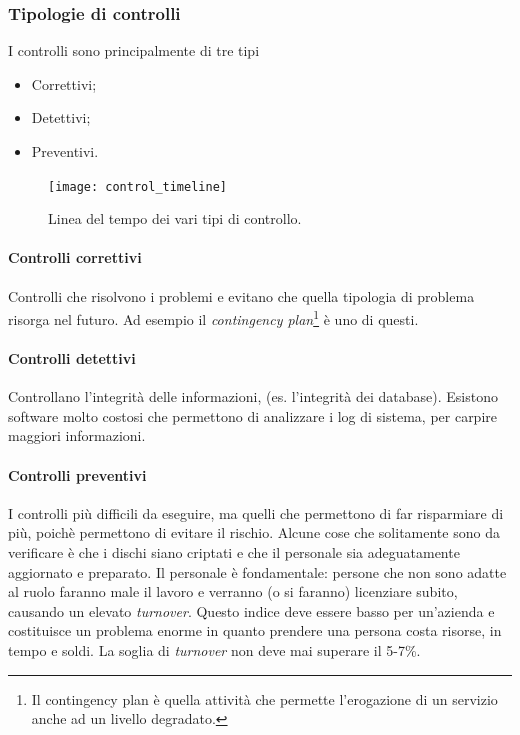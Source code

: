 \subsubsection{Tipologie di controlli}

I controlli sono principalmente di tre tipi
\begin{itemize}
\item Correttivi;
\item Detettivi;
\item Preventivi.
\end{itemize}

\begin{figure}[H]
	\begin{center}
\texttt{[image: control\_timeline]}
	\end{center}
	\caption{Linea del tempo dei vari tipi di controllo.}
\end{figure}

\paragraph*{Controlli correttivi} Controlli che risolvono i problemi e
evitano che quella tipologia di problema risorga nel futuro. Ad esempio il
\textit{contingency plan}\footnote{Il contingency plan è quella
attività che permette l'erogazione di un servizio anche ad un livello
degradato.} è uno di questi.

\paragraph*{Controlli detettivi} Controllano l'integrità delle
informazioni, (es. l'integrità dei database). Esistono software
molto costosi che permettono di analizzare i log di sistema, per carpire
maggiori informazioni.

\paragraph*{Controlli preventivi} I controlli più difficili da eseguire, ma
quelli che permettono di far risparmiare di più, poichè permettono di evitare
il rischio. Alcune cose che solitamente sono da verificare è che i dischi siano 
criptati e che il personale sia adeguatamente aggiornato e preparato.
Il personale è fondamentale: persone che non sono adatte al ruolo faranno male
il lavoro e verranno (o si faranno) licenziare subito, causando un
elevato \textit{turnover}. Questo indice deve essere basso per un'azienda e
costituisce un problema enorme in quanto prendere una persona costa risorse, in
tempo e soldi. La soglia di \textit{turnover} non deve mai superare il 5-7\%.

